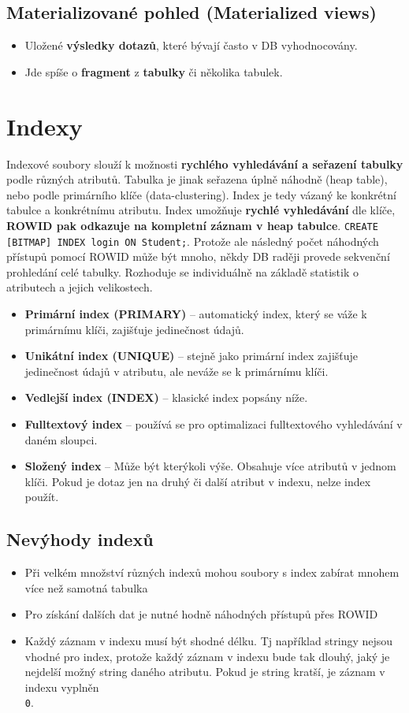 \subsection{Materializované pohled (Materialized views)}
\begin{itemize}
  \item Uložené \textbf{výsledky dotazů}, které bývají často v DB vyhodnocovány.
  \item Jde spíše o \textbf{fragment} z \textbf{tabulky} či několika tabulek.
\end{itemize}

\section{Indexy}
Indexové soubory slouží k možnosti \textbf{rychlého vyhledávání a seřazení tabulky} podle různých atributů. Tabulka je jinak seřazena úplně náhodně (heap table), nebo podle primárního klíče (data-clustering). Index je tedy vázaný ke konkrétní tabulce a konkrétnímu atributu. Index umožňuje \textbf{rychlé vyhledávání} dle klíče, \textbf{ROWID pak odkazuje na kompletní záznam v heap tabulce}. \texttt{CREATE [BITMAP] INDEX login ON Student;}. Protože ale následný počet náhodných přístupů pomocí ROWID může být mnoho, někdy DB raději provede sekvenční prohledání celé tabulky. Rozhoduje se individuálně na základě statistik o atributech a jejich velikostech.
\begin{itemize}
  \item \textbf{Primární index (PRIMARY)} -- automatický index, který se váže k primárnímu klíči, zajišťuje jedinečnost údajů.
  \item \textbf{Unikátní index (UNIQUE)} -- stejně jako primární index zajišťuje jedinečnost údajů v atributu, ale neváže se k primárnímu klíči.
  \item \textbf{Vedlejší index (INDEX)} -- klasické index popsány níže.
  \item \textbf{Fulltextový index} -- používá se pro optimalizaci fulltextového vyhledávání v daném sloupci.
  \item \textbf{Složený index} -- Může být kterýkoli výše. Obsahuje více atributů v jednom klíči. Pokud je dotaz jen na druhý či další atribut v indexu, nelze index použít.
\end{itemize}

\subsection{Nevýhody indexů}
\begin{itemize}
  \item Při velkém množství různých indexů mohou soubory s index zabírat mnohem více než samotná tabulka
  \item Pro získání dalších dat je nutné hodně náhodných přístupů přes ROWID
  \item Každý záznam v indexu musí být shodné délku. Tj například stringy nejsou vhodné pro index, protože každý záznam v indexu bude tak dlouhý, jaký je nejdelší možný string daného atributu. Pokud je string kratší, je záznam v indexu vyplněn \texttt{\\0}.
\end{itemize}


